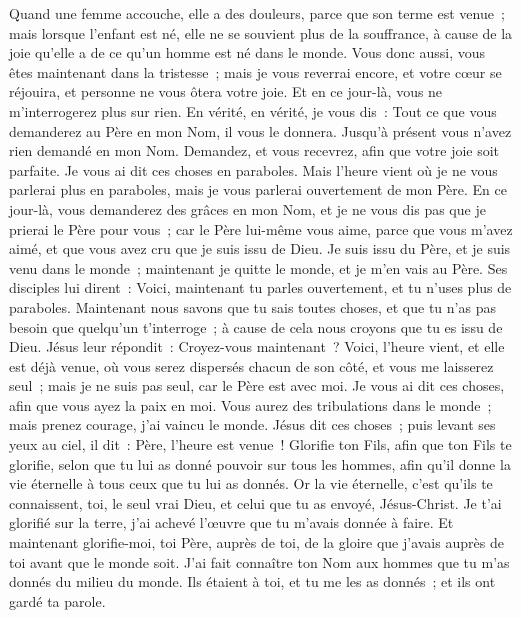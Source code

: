 \begin{multicols}{2}
Quand une femme accouche, elle a des douleurs, parce que son terme est venue~; mais lorsque l'enfant est né, elle ne se souvient plus de la souffrance, à cause de la joie qu'elle a de ce qu'un homme est né dans le monde.
Vous donc aussi, vous êtes maintenant dans la tristesse~; mais je vous reverrai encore, et votre cœur se réjouira, et personne ne vous ôtera votre joie.
Et en ce jour-là, vous ne m'interrogerez plus sur rien. En vérité, en vérité, je vous dis~: Tout ce que vous demanderez au Père en mon Nom, il vous le donnera.
Jusqu'à présent vous n'avez rien demandé en mon Nom. Demandez, et vous recevrez, afin que votre joie soit parfaite.
Je vous ai dit ces choses en paraboles. Mais l'heure vient où je ne vous parlerai plus en paraboles, mais je vous parlerai ouvertement de mon Père.
En ce jour-là, vous demanderez des grâces en mon Nom, et je ne vous dis pas que je prierai le Père pour vous~;
car le Père lui-même vous aime, parce que vous m'avez aimé, et que vous avez cru que je suis issu de Dieu.
Je suis issu du Père, et je suis venu dans le monde~; maintenant je quitte le monde, et je m'en vais au Père.
Ses disciples lui dirent~: Voici, maintenant tu parles ouvertement, et tu n'uses plus de paraboles.
Maintenant nous savons que tu sais toutes choses, et que tu n'as pas besoin que quelqu'un t'interroge~; à cause de cela nous croyons que tu es issu de Dieu.
Jésus leur répondit~: Croyez-vous maintenant~?
Voici, l'heure vient, et elle est déjà venue, où vous serez dispersés chacun de son côté, et vous me laisserez seul~; mais je ne suis pas seul, car le Père est avec moi.
Je vous ai dit ces choses, afin que vous ayez la paix en moi. Vous aurez des tribulations dans le monde~; mais prenez courage, j'ai vaincu le monde.
\VerseOne{}Jésus dit ces choses~; puis levant ses yeux au ciel, il dit~: Père, l'heure est venue~! Glorifie ton Fils, afin que ton Fils te glorifie,
selon que tu lui as donné pouvoir sur tous les hommes, afin qu'il donne la vie éternelle à tous ceux que tu lui as donnés.
Or la vie éternelle, c'est qu'ils te connaissent, toi, le seul vrai Dieu, et celui que tu as envoyé, Jésus-Christ.
Je t'ai glorifié sur la terre, j'ai achevé l'œuvre que tu m'avais donnée à faire.
Et maintenant glorifie-moi, toi Père, auprès de toi, de la gloire que j'avais auprès de toi avant que le monde soit.
J'ai fait connaître ton Nom aux hommes que tu m'as donnés du milieu du monde. Ils étaient à toi, et tu me les as donnés~; et ils ont gardé ta parole.

\end{multicols}
